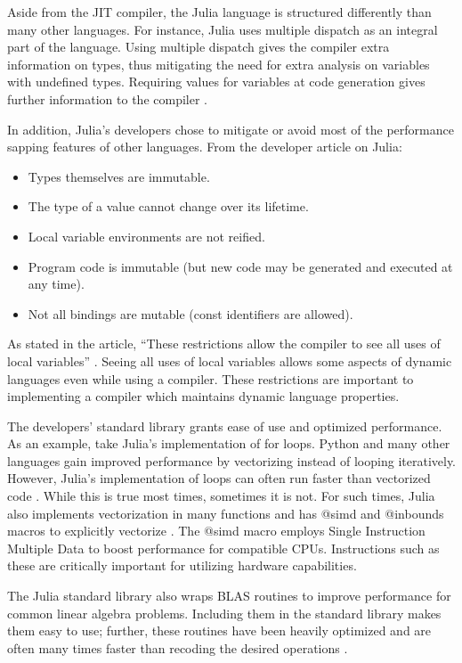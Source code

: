 \documentclass[12pt]{article}
\begin{document}
Aside from the JIT compiler, the Julia language is structured differently than many other languages. For instance, Julia uses multiple dispatch as an integral part of the language. Using multiple dispatch gives the compiler extra information on types, thus mitigating the need for extra analysis on variables with undefined types. Requiring values for variables at code generation gives further information to the compiler \cite{devpaper}.

In addition, Julia's developers chose to mitigate or avoid most of the performance sapping features of other languages. From the developer article on Julia\cite{devpaper}:
\begin{itemize}
	\item Types themselves are immutable.
    \item The type of a value cannot change over its lifetime.
    \item Local variable environments are not reified.
    \item Program code is immutable (but new code may be generated and executed at any time).
    \item Not all bindings are mutable (const identifiers are allowed).
\end{itemize}

As stated in the article, ``These restrictions allow the compiler to see all uses of local variables'' \cite{devpaper}. Seeing all uses of local variables allows some aspects of dynamic languages even while using a compiler. These restrictions are important to implementing a compiler which maintains dynamic language properties.

The developers' standard library grants ease of use and optimized performance. As an example, take Julia's implementation of for loops. Python and many other languages gain improved performance by vectorizing instead of looping iteratively. However, Julia's implementation of loops can often run faster than vectorized code \cite{juliafastcomp}. While this is true most times, sometimes it is not. For such times, Julia also implements vectorization in many functions and has @simd and @inbounds macros to explicitly vectorize \cite{juliavec}. The @simd macro employs Single Instruction Multiple Data to boost performance for compatible CPUs. Instructions such as these are critically important for utilizing hardware capabilities.

The Julia standard library also wraps BLAS routines to improve performance for common linear algebra problems. Including them in the standard library makes them easy to use; further, these routines have been heavily optimized and are often many times faster than recoding the desired operations \cite{juliafastcomp}.
\end{document}

